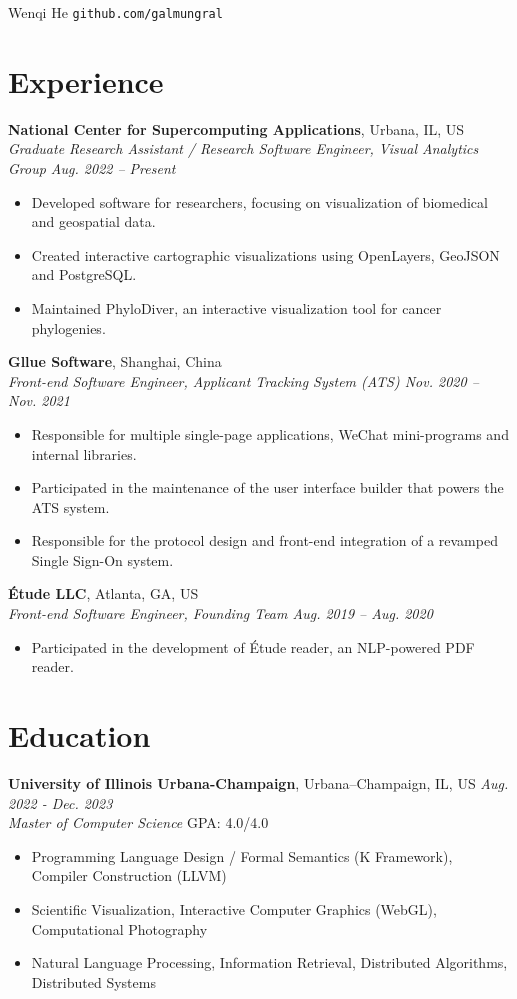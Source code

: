 \documentclass[12pt]{article}
\begin{document}
{\Huge Wenqi He} \quad \texttt{github.com/galmungral}

\section*{Experience}
\textbf{National Center for Supercomputing Applications}, Urbana, IL, US\\
\textit{\textit{Graduate Research Assistant / Research Software Engineer}, Visual Analytics Group \hfill Aug. 2022 -- Present}
\begin{itemize}
\item Developed software for researchers, focusing on visualization of biomedical and geospatial data.
\item Created interactive cartographic visualizations using OpenLayers, GeoJSON and PostgreSQL.
\item Maintained PhyloDiver, an interactive visualization tool for cancer phylogenies.
\end{itemize}
\vspace{0.5em}
\textbf{Gllue Software}, Shanghai, China\\
\textit{Front-end Software Engineer, Applicant Tracking System (ATS) \hfill Nov. 2020 -- Nov. 2021}
\begin{itemize}
\item Responsible for multiple single-page applications, WeChat mini-programs and internal libraries.
\item Participated in the maintenance of the user interface builder that powers the ATS system.
\item Responsible for the protocol design and front-end integration of a revamped Single Sign-On system.
\end{itemize}
\vspace{0.5em}
\textbf{Étude LLC}, Atlanta, GA, US\\
\textit{Front-end Software Engineer, Founding Team \hfill Aug. 2019 -- Aug. 2020}
\begin{itemize}
\item Participated in the development of Étude reader, an NLP-powered PDF reader.
\end{itemize}

\section*{Education}
\textbf{University of Illinois Urbana-Champaign}, Urbana–Champaign, IL, US \hfill \textit{Aug. 2022 - Dec. 2023} \\
\textit{Master of Computer Science}  \hfill GPA: 4.0/4.0 
\begin{itemize}
\item Programming Language Design / Formal Semantics (K Framework), Compiler Construction (LLVM)
\item Scientific Visualization, Interactive Computer Graphics (WebGL), Computational Photography
\item Natural Language Processing, Information Retrieval, Distributed Algorithms, Distributed Systems
\end{itemize}
\end{document}
